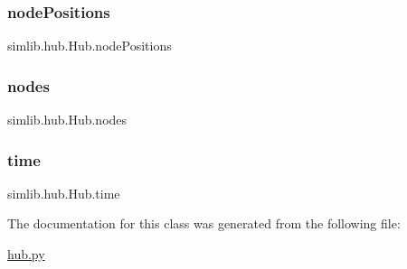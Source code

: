 \subsubsection{\texorpdfstring{node\+Positions}{nodePositions}}
{\footnotesize\ttfamily simlib.\+hub.\+Hub.\+node\+Positions}

\mbox{\label{classsimlib_1_1hub_1_1_hub_a61a34379fa5ce06d05763918fa3c619d}} 
\subsubsection{\texorpdfstring{nodes}{nodes}}
{\footnotesize\ttfamily simlib.\+hub.\+Hub.\+nodes}

\mbox{\label{classsimlib_1_1hub_1_1_hub_a7db7bfdb073f30c1743c759f80e7bee0}} 
\subsubsection{\texorpdfstring{time}{time}}
{\footnotesize\ttfamily simlib.\+hub.\+Hub.\+time}



The documentation for this class was generated from the following file\+:\begin{DoxyCompactItemize}
\item 
\mbox{\hyperlink{hub_8py}{hub.\+py}}\end{DoxyCompactItemize}
